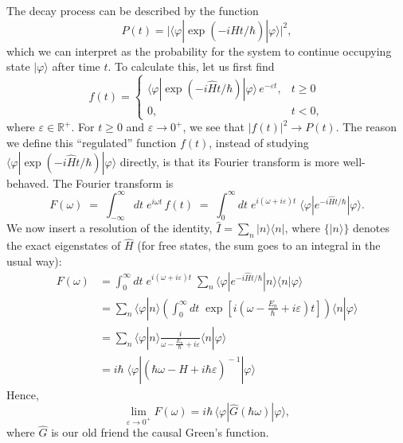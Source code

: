 \documentclass[pra,12pt]{revtex4}
\begin{document}
The decay process can be described by the function
$$P(t) = \Big|\langle\varphi|\exp\left(-i\hat{H}t/\hbar\right)|\varphi\rangle\Big|^2,$$
which we can interpret as the probability for the system to continue
occupying state $|\varphi\rangle$ after time $t$.  To calculate this,
let us first find
$$f(t) = \begin{cases} \langle\varphi|\exp\left(-i\hat{H}t/\hbar\right)|\varphi\rangle \,e^{-\varepsilon t}, & t \ge 0 \\ 0, & t < 0,\end{cases}$$
where $\varepsilon \in \mathbb{R}^+$.  For $t \ge 0$ and $\varepsilon
\rightarrow 0^+$, we see that $|f(t)|^2 \rightarrow P(t)$.  The reason
we define this ``regulated'' function $f(t)$, instead of studying
$\langle\varphi|\exp(-i\hat{H}t/\hbar)|\varphi\rangle$ directly, is
that its Fourier transform is more well-behaved.  The Fourier transform is
$$F(\omega) \;=\; \int_{-\infty}^\infty dt \; e^{i\omega t}\, f(t) \;=\; \int_0^\infty dt \; e^{i(\omega + i\varepsilon) t} \; \langle\varphi|e^{-i\hat{H}t/\hbar}|\varphi\rangle.$$
We now insert a resolution of the identity, $\hat{I} = \sum_n
|n\rangle\langle n|$, where $\{|n\rangle\}$ denotes the exact
eigenstates of $\hat{H}$ (for free states, the sum goes to an integral
in the usual way):
$$\begin{aligned}F(\omega) &= \int_0^\infty dt \; e^{i(\omega + i\varepsilon) t} \; \sum_n \langle\varphi|e^{-i\hat{H}t/\hbar}|n\rangle\langle n|\varphi\rangle \\ &= \sum_n \langle\varphi|n\rangle \left( \int_0^\infty dt \; \exp\left[i\left(\omega - \frac{E_n}{\hbar} + i\varepsilon\right) t\right] \right) \langle n|\varphi\rangle \\ &= \sum_n \langle\varphi|n\rangle \frac{i}{\omega - \frac{E_n}{\hbar} + i \varepsilon} \langle n|\varphi\rangle \\ &= i \hbar\; \langle \varphi | \left(\hbar\omega - \hat{H} + i\hbar\varepsilon \right)^{\!-1} | \varphi\rangle \end{aligned}$$
Hence, 
$$\lim_{\varepsilon \rightarrow 0^+} F(\omega) = i \hbar \, \langle \varphi | \hat{G}(\hbar\omega) | \varphi\rangle,$$
where $\hat{G}$ is our old friend the causal Green's function.
\end{document}
